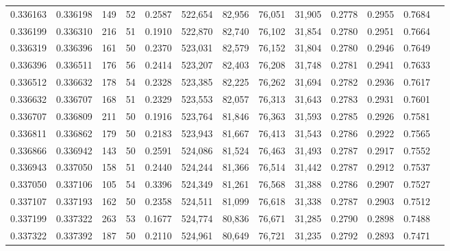\begin{tabular}{rrrrrrrrrrrrr}
0.336163 & 0.336198 &   149 &  52 &                                     0.2587 & 522,654 &  82,956 &  76,051 &  31,905 & 0.2778 & 0.2955 & 0.7684 \\
0.336199 & 0.336310 &   216 &  51 &                                     0.1910 & 522,870 &  82,740 &  76,102 &  31,854 & 0.2780 & 0.2951 & 0.7664 \\
0.336319 & 0.336396 &   161 &  50 &                                     0.2370 & 523,031 &  82,579 &  76,152 &  31,804 & 0.2780 & 0.2946 & 0.7649 \\
0.336396 & 0.336511 &   176 &  56 &                                     0.2414 & 523,207 &  82,403 &  76,208 &  31,748 & 0.2781 & 0.2941 & 0.7633 \\
0.336512 & 0.336632 &   178 &  54 &                                     0.2328 & 523,385 &  82,225 &  76,262 &  31,694 & 0.2782 & 0.2936 & 0.7617 \\
0.336632 & 0.336707 &   168 &  51 &                                     0.2329 & 523,553 &  82,057 &  76,313 &  31,643 & 0.2783 & 0.2931 & 0.7601 \\
0.336707 & 0.336809 &   211 &  50 &                                     0.1916 & 523,764 &  81,846 &  76,363 &  31,593 & 0.2785 & 0.2926 & 0.7581 \\
0.336811 & 0.336862 &   179 &  50 &                                     0.2183 & 523,943 &  81,667 &  76,413 &  31,543 & 0.2786 & 0.2922 & 0.7565 \\
0.336866 & 0.336942 &   143 &  50 &                                     0.2591 & 524,086 &  81,524 &  76,463 &  31,493 & 0.2787 & 0.2917 & 0.7552 \\
0.336943 & 0.337050 &   158 &  51 &                                     0.2440 & 524,244 &  81,366 &  76,514 &  31,442 & 0.2787 & 0.2912 & 0.7537 \\
0.337050 & 0.337106 &   105 &  54 &                                     0.3396 & 524,349 &  81,261 &  76,568 &  31,388 & 0.2786 & 0.2907 & 0.7527 \\
0.337107 & 0.337193 &   162 &  50 &                                     0.2358 & 524,511 &  81,099 &  76,618 &  31,338 & 0.2787 & 0.2903 & 0.7512 \\
0.337199 & 0.337322 &   263 &  53 &                                     0.1677 & 524,774 &  80,836 &  76,671 &  31,285 & 0.2790 & 0.2898 & 0.7488 \\
0.337322 & 0.337392 &   187 &  50 &                                     0.2110 & 524,961 &  80,649 &  76,721 &  31,235 & 0.2792 & 0.2893 & 0.7471 \\

\end{tabular}
